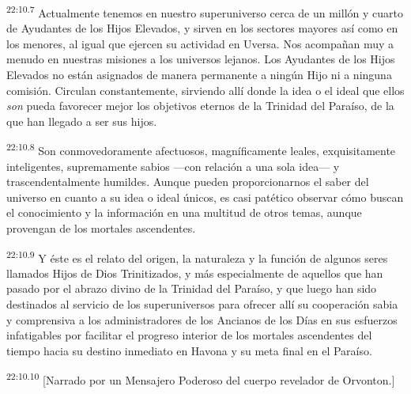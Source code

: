 \par
\textsuperscript{22:10.7} Actualmente tenemos en nuestro superuniverso cerca de un millón y cuarto de Ayudantes de los Hijos Elevados, y sirven en los sectores mayores así como en los menores, al igual que ejercen su actividad en Uversa. Nos acompañan muy a menudo en nuestras misiones a los universos lejanos. Los Ayudantes de los Hijos Elevados no están asignados de manera permanente a ningún Hijo ni a ninguna comisión. Circulan constantemente, sirviendo allí donde la idea o el ideal que ellos \textit{son} pueda favorecer mejor los objetivos eternos de la Trinidad del Paraíso, de la que han llegado a ser sus hijos.

\par
\textsuperscript{22:10.8} Son conmovedoramente afectuosos, magníficamente leales, exquisitamente inteligentes, supremamente sabios ---con relación a una sola idea--- y trascendentalmente humildes. Aunque pueden proporcionarnos el saber del universo en cuanto a su idea o ideal únicos, es casi patético observar cómo buscan el conocimiento y la información en una multitud de otros temas, aunque provengan de los mortales ascendentes.

\par
\textsuperscript{22:10.9} Y éste es el relato del origen, la naturaleza y la función de algunos seres llamados Hijos de Dios Trinitizados, y más especialmente de aquellos que han pasado por el abrazo divino de la Trinidad del Paraíso, y que luego han sido destinados al servicio de los superuniversos para ofrecer allí su cooperación sabia y comprensiva a los administradores de los Ancianos de los Días en sus esfuerzos infatigables por facilitar el progreso interior de los mortales ascendentes del tiempo hacia su destino inmediato en Havona y su meta final en el Paraíso.

\par
\textsuperscript{22:10.10} [Narrado por un Mensajero Poderoso del cuerpo revelador de Orvonton.]